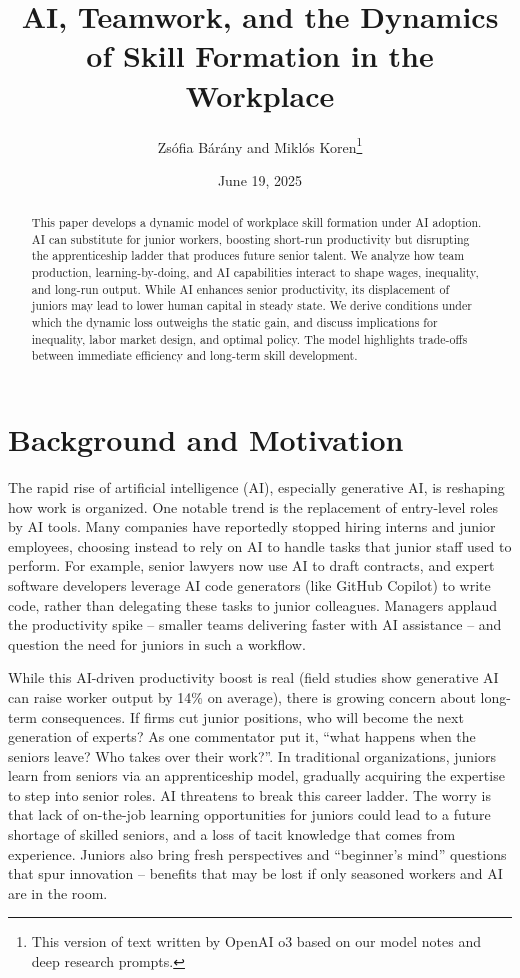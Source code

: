 \documentclass[12pt]{article}
\title{AI, Teamwork, and the Dynamics of Skill Formation in the Workplace}
\author{Zsófia Bárány and Miklós Koren\thanks{This version of text written by OpenAI o3 based on our model notes and deep research prompts.}}
\date{June 19, 2025}
\begin{document}
\maketitle
\begin{abstract}
This paper develops a dynamic model of workplace skill formation under AI adoption. AI can substitute for junior workers, boosting short-run productivity but disrupting the apprenticeship ladder that produces future senior talent. We analyze how team production, learning-by-doing, and AI capabilities interact to shape wages, inequality, and long-run output. While AI enhances senior productivity, its displacement of juniors may lead to lower human capital in steady state. We derive conditions under which the dynamic loss outweighs the static gain, and discuss implications for inequality, labor market design, and optimal policy. The model highlights trade-offs between immediate efficiency and long-term skill development.
\end{abstract}
\section{Background and Motivation}\label{background-and-motivation}

The rapid rise of artificial intelligence (AI), especially generative AI, is reshaping how work is organized. One notable trend is the {replacement of entry-level roles by AI tools}. Many companies have reportedly stopped hiring interns and junior employees, choosing instead to rely on AI to handle tasks that junior staff used to perform. For example, {senior lawyers now use AI to draft contracts}, and {expert software developers leverage AI code generators (like GitHub Copilot) to write code}, rather than delegating these tasks to junior colleagues. Managers applaud the productivity spike -- {smaller teams delivering faster with AI assistance} -- and question the need for juniors in such a workflow. 

While this {AI-driven productivity boost} is real (field studies show generative AI can raise worker output by 14\% on average), there is
growing concern about {long-term consequences}. If firms cut junior positions, {who will become the next generation of experts?}
As one commentator put it, {``what happens when the seniors leave?
Who takes over their work?''}. In traditional organizations, juniors
learn from seniors via an {apprenticeship model}, gradually
acquiring the expertise to step into senior roles. AI threatens to break
this {career ladder}. The worry is that {lack of
on-the-job learning opportunities} for juniors could lead to a future
shortage of skilled seniors, and a loss of tacit knowledge that comes
from experience. Juniors also bring fresh perspectives and ``beginner's
mind'' questions that spur innovation -- benefits that may be lost if
only seasoned workers and AI are in the room.
\end{document}
